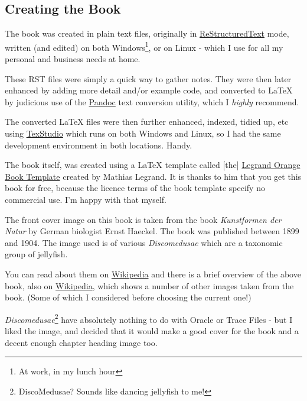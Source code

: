 \begin{appendix}
\section{Creating the Book}\label{creating-the-book}

The book was created in plain text files, originally in \href{https://en.wikipedia.org/wiki/ReStructuredText}{ReStructuredText} mode, written (and edited) on both Windows\footnote{At work, in my lunch hour}, or on Linux - which I use for all my personal and business needs at home.

These RST files were simply a quick way to gather notes. They were then later enhanced by adding more detail and/or example code, and converted to \LaTeX{}\program{\LaTeX{}} by judicious use of the \href{https://pandoc.org/}{Pandoc} text conversion utility, which I \emph{highly} recommend.

The converted \LaTeX{}\program{\LaTeX{}} files were then further enhanced, indexed, tidied up, etc using \href{http://www.texstudio.org/}{TexStudio} which runs on both Windows and Linux, so I had the same development environment in both locations. Handy. 

The book itself, was created using a \LaTeX{}\program{\LaTeX{}} template called [the] \href{https://www.latextemplates.com/template/the-legrand-orange-book}{Legrand Orange Book Template} created by Mathias Legrand. It is thanks to him that you get this book for free, because the licence terms of the book template specify no commercial use. I'm happy with that myself.

The front cover image on this book is taken from the book \emph{Kunstformen der Natur} by German biologist Ernst Haeckel. The book was published between 1899 and 1904. The image used is of various \emph{Discomedusae} which are a taxonomic group of jellyfish.

You can read about them on \href{https://en.wikipedia.org/wiki/Discomedusae}{Wikipedia} and there is a brief overview of the above book, also on \href{https://en.wikipedia.org/wiki/Kunstformen_der_Natur}{Wikipedia},
which shows a number of other images taken from the book. (Some of which I considered before choosing the current one!)

\emph{Discomedusae}\footnote{DiscoMedusae? Sounds like dancing jellyfish to me!} have absolutely nothing to do with Oracle or Trace Files - but I liked the image, and decided that it would make a good cover for the book and a decent enough chapter heading image too.


\end{appendix}
